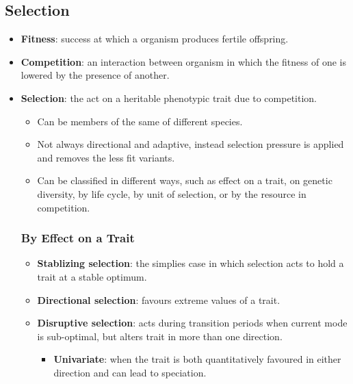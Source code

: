 \documentclass[12pt,a4paper]{article}
\begin{document}
\subsection{Selection}
\begin{itemize}
    \item \textbf{Fitness}: success at which a organism produces fertile offspring.
    \item \textbf{Competition}: an interaction between organism in which the fitness of one is lowered by the presence of another.
    \item \textbf{Selection}: the act on a heritable phenotypic trait due to competition.
    \begin{itemize}
        \item Can be members of the same of different species.
        \item Not always directional and adaptive, instead selection pressure is applied and removes the less fit variants.
        \item Can be classified in different ways, such as effect on a trait, on genetic diversity, by life cycle, by unit of selection, or by the resource in competition.
    \end{itemize}
    \subsubsection{By Effect on a Trait}
    \begin{itemize}
        \item \textbf{Stablizing selection}: the simplies case in which selection acts to hold a trait at a stable optimum.
        \item \textbf{Directional selection}: favours extreme values of a trait.
        \item \textbf{Disruptive selection}: acts during transition periods when current mode is sub-optimal, but alters trait in more than one direction.
            \begin{itemize}
                \item \textbf{Univariate}: when the trait is both quantitatively favoured in either direction and can lead to speciation.
            \end{itemize}
    \end{itemize}

\end{itemize}
\end{document}
